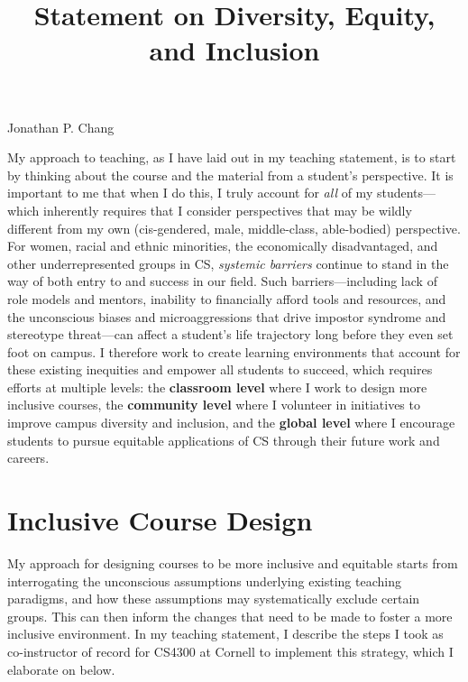\documentclass[12pt,letterpaper]{article}
\title{Statement on Diversity, Equity, and Inclusion}
\begin{document}
\maketitle

{\centering Jonathan P. Chang \par}

\vspace{0.5\baselineskip}

My approach to teaching, as I have laid out in my teaching statement, is to start by thinking about the course and the material from a student's perspective.
It is important to me that when I do this, I truly account for \emph{all} of my students---which inherently requires that I consider perspectives that may be wildly different from my own (cis-gendered, male, middle-class, able-bodied) perspective.
For women, racial and ethnic minorities, the economically disadvantaged, and other underrepresented groups in CS, \emph{systemic barriers} continue to stand in the way of both entry to and success in our field.
Such barriers---including lack of role models and mentors, inability to financially afford tools and resources, and the unconscious biases and microaggressions that drive impostor syndrome and stereotype threat---can affect a student's life trajectory long before they even set foot on campus.
I therefore work to create learning environments that account for these existing inequities and empower all students to succeed, which requires efforts at multiple levels: the \textbf{classroom level} where I work to design more inclusive courses, the \textbf{community level} where I volunteer in initiatives to improve campus diversity and inclusion, and the \textbf{global level} where I encourage students to pursue equitable applications of CS through their future work and careers.

\section{Inclusive Course Design}
My approach for designing courses to be more inclusive and equitable starts from interrogating the unconscious assumptions underlying existing teaching paradigms, and how these assumptions may systematically exclude certain groups.
This can then inform the changes that need to be made to foster a more inclusive environment.
In my teaching statement, I describe the steps I took as co-instructor of record for CS4300 at Cornell to implement this strategy, which I elaborate on below.
\end{document}
